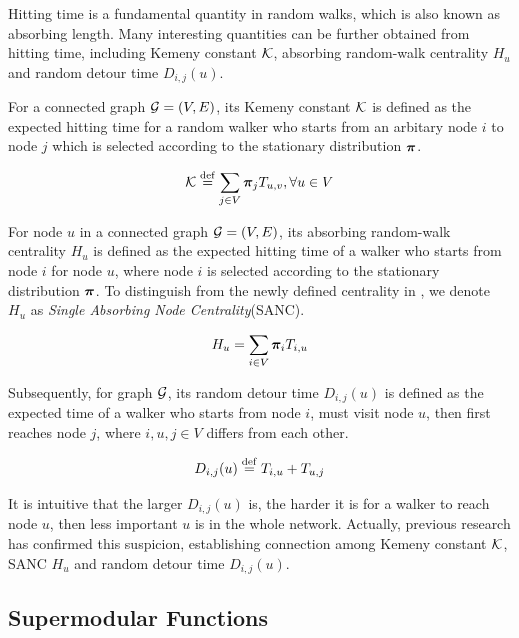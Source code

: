 \documentclass[sigconf]{acmart}
\begin{document}
Hitting time is a fundamental quantity in random walks, which is also known as absorbing length.
Many interesting quantities can be further obtained from hitting time, including Kemeny constant \(\mathcal{K}\), absorbing random-walk centrality \(H_u\) and random detour time \(D_{i,j}(u)\).

For a connected graph \(\mathcal{G}=(V,E)\), its Kemeny constant \(\mathcal{K}\) is defined as the expected hitting time for a random walker who starts from an arbitary node \(i\) to node \(j\) which is selected according to the stationary distribution \(\boldsymbol{\pi}\).
\begin{definition}\label{def:kemeny}
    \[\mathcal{K}\stackrel{\mathrm{def}}{=}\sum_{j\in V}\boldsymbol{\pi}_jT_{u,v},\forall u\in V\]
\end{definition}

For node \(u\) in a connected graph \(\mathcal{G}=(V,E)\), its absorbing random-walk centrality \(H_u\) is defined as the expected hitting time of a walker who starts from node \(i\) for node \(u\), where node \(i\) is selected according to the stationary distribution \(\boldsymbol{\pi}\).
To distinguish from the newly defined centrality in , we denote \(H_u\) as \textit{Single Absorbing Node Centrality}(SANC).

\begin{definition}[SANC]\label{def:sanc}
    \[H_u=\sum_{i\in V}\boldsymbol{\pi}_iT_{i,u}\]
\end{definition}

Subsequently, for graph \(\mathcal{G}\), its random detour time \(D_{i,j}(u)\) is defined as the expected time of a walker who starts from node \(i\), must visit node \(u\), then first reaches node \(j\), where \(i,u,j\in V\) differs from each other.

\begin{definition}\label{def:detour-single}
    \[D_{i,j}(u)\stackrel{\mathrm{def}}{=} T_{i,u}+T_{u,j}\]
\end{definition}

It is intuitive that the larger \(D_{i,j}(u)\) is, the harder it is for a walker to reach node \(u\), then less important \(u\) is in the whole network.
Actually, previous research has confirmed this suspicion, establishing connection among Kemeny constant \(\mathcal{K}\), SANC \(H_u\) and random detour time \(D_{i,j}(u)\).

\subsection{Supermodular Functions}
\end{document}
